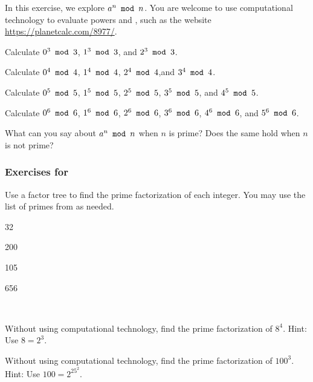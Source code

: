 \begin{exer}[\exerE] %
\label{exer_fermat_little}
    In this exercise, we explore $a^n \texttt{ mod } n$.  You are welcome to use computational technology to evaluate powers and , such as the website \url{https://planetcalc.com/8977/}.
    \begin{exerpart}
        \item Calculate $0^3 \texttt{ mod } 3$, $1^3 \texttt{ mod } 3$, and $2^3 \texttt{ mod } 3$.
        \item Calculate $0^4 \texttt{ mod } 4$, $1^4 \texttt{ mod } 4$, $2^4 \texttt{ mod } 4$,and $3^4 \texttt{ mod } 4$.
        \item Calculate $0^5 \texttt{ mod } 5$, $1^5 \texttt{ mod } 5$, $2^5 \texttt{ mod } 5$, $3^5 \texttt{ mod } 5$, and $4^5 \texttt{ mod } 5$.
        \item Calculate $0^6 \texttt{ mod } 6$, $1^6 \texttt{ mod } 6$, $2^6 \texttt{ mod } 6$, $3^6 \texttt{ mod } 6$, $4^6 \texttt{ mod } 6$, and $5^6 \texttt{ mod } 6$.
        \item What can you say about $a^n \texttt{ mod } n$ when $n$ is prime?  Does the same hold when $n$ is not prime?
    \end{exerpart}
\end{exer}



\subsubsection*{Exercises for  \subprimefact}

\begin{exer}[\exerP] %
\label{exer_factor_trees}
    Use a factor tree to find the prime factorization of each integer.  You may use the list of primes from  as needed. 
        \begin{exerpart}
            \item 32
            \item 200
            \item 105
            \item 656
        \end{exerpart}
\end{exer}

\begin{exer}[\exerU] %
\label{exer_prime_fact__powers} 
~
    \begin{exerpart}
        \item Without using computational technology, find the prime factorization of $8^4$. Hint: Use $8=2^3$.
        \item Without using computational technology, find the prime factorization of $100^3$.  Hint: Use $100=2^25^2$.
    \end{exerpart}
\end{exer}

